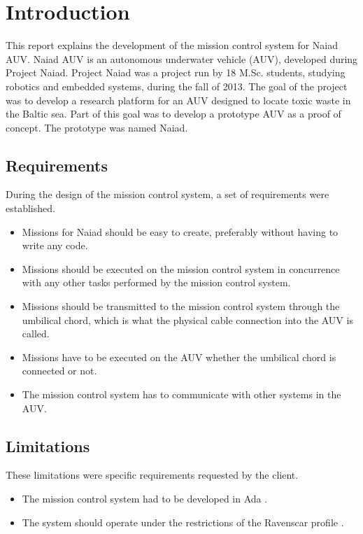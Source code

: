 \section{Introduction}\label{sec:introduction}
This report explains the development of the mission control system for Naiad AUV. Naiad AUV is an autonomous underwater vehicle (AUV), developed during Project Naiad. Project Naiad was a project run by 18 M.Sc. students, studying robotics and embedded systems, during the fall of 2013. The goal of the project was to develop a research platform for an AUV designed to locate toxic waste in the Baltic sea. Part of this goal was to develop a prototype AUV as a proof of concept. The prototype was named Naiad.
\newline
\subsection{Requirements}
During the design of the mission control system, a set of requirements were established.
\begin{itemize}
\item Missions for Naiad should be easy to create, preferably without having to write any code.
\item Missions should be executed on the mission control system in concurrence with any other tasks performed by the mission control system.
\item Missions should be transmitted to the mission control system through the umbilical chord, which is what the physical cable connection into the AUV is called.
\item Missions have to be executed on the AUV whether the umbilical chord is connected or not.
\item The mission control system has to communicate with other systems in the AUV.
\end{itemize}

\subsection{Limitations}
These limitations were specific requirements requested by the client.
\begin{itemize}
\item The mission control system had to be developed in Ada \cite{web:mcsada}.
\item The system should operate under the restrictions of the Ravenscar profile \cite{article:mcsraven}. 
\end{itemize}
